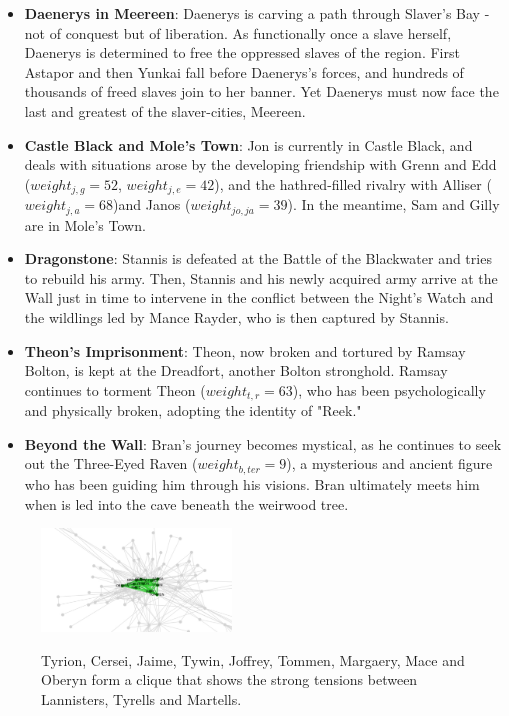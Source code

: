 \documentclass[10pt,twocolumn,letterpaper]{article}
\begin{document}
\begin{itemize}
    \item \textbf{Daenerys in Meereen}: Daenerys is carving a path through Slaver's Bay - not of conquest but of liberation. As functionally once a slave herself, Daenerys is determined to free the oppressed slaves of the region. First Astapor and then Yunkai fall before Daenerys's forces, and hundreds of thousands of freed slaves join to her banner. Yet Daenerys must now face the last and greatest of the slaver-cities, Meereen.
    \item \textbf{Castle Black and Mole's Town}: Jon is currently in Castle Black, and deals with situations arose by the developing friendship with Grenn and Edd ($weight_{j,g}=52$, $weight_{j,e}=42$), and the hathred-filled rivalry with Alliser ($weight_{j,a}=68$)and Janos ($weight_{jo,ja}=39$). In the meantime, Sam and Gilly are in Mole's Town.
    \item \textbf{Dragonstone}: Stannis is defeated at the Battle of the Blackwater and tries to rebuild his army. Then, Stannis and his newly acquired army arrive at the Wall just in time to intervene in the conflict between the Night's Watch and the wildlings led by Mance Rayder, who is then captured by Stannis.
    \item \textbf{Theon's Imprisonment}: Theon, now broken and tortured by Ramsay Bolton, is kept at the Dreadfort, another Bolton stronghold. Ramsay continues to torment Theon ($weight_{t,r}=63$), who has been psychologically and physically broken, adopting the identity of "Reek."
    \item \textbf{Beyond the Wall}: Bran's journey becomes mystical, as he continues to seek out the Three-Eyed Raven ($weight_{b,ter}=9$), a mysterious and ancient figure who has been guiding him through his visions. Bran ultimately meets him when is led into the cave beneath the weirwood tree.
    
\end{itemize}

\begin{figure}[!h]
    \centering
    \includegraphics[width=0.45\textwidth]{img/s4/clique.jpg} \\
    \caption{\small{Tyrion, Cersei, Jaime, Tywin, Joffrey, Tommen, Margaery, Mace and Oberyn form a clique that shows the strong tensions between Lannisters, Tyrells and Martells.}}
    \label{fig:clique_s4}
\end{figure}
\end{document}
